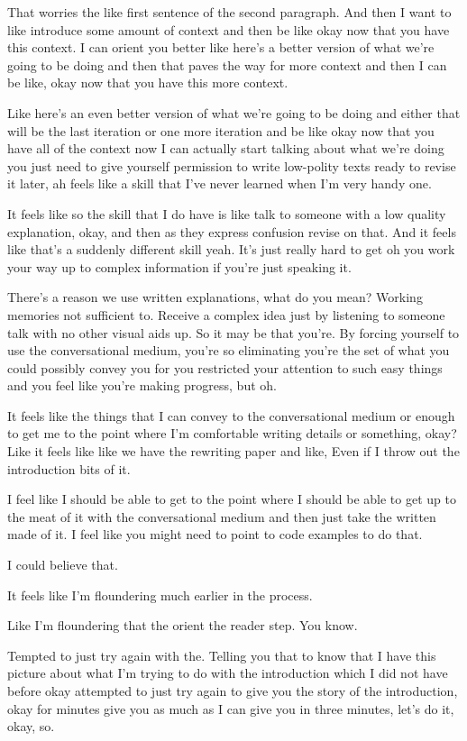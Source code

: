 \begin{subappendices}
That worries the like first sentence of the second paragraph. And then I want to like introduce some amount of context and then be like okay now that you have this context. I can orient you better like here's a better version of what we're going to be doing and then that paves the way for more context and then I can be like, okay now that you have this more context.

Like here's an even better version of what we're going to be doing and either that will be the last iteration or one more iteration and be like okay now that you have all of the context now I can actually start talking about what we're doing you just need to give yourself permission to write low-polity texts ready to revise it later, ah feels like a skill that I've never learned when I'm very handy one.

It feels like so the skill that I do have is like talk to someone with a low quality explanation, okay, and then as they express confusion revise on that. And it feels like that's a suddenly different skill yeah. It's just really hard to get oh you work your way up to complex information if you're just speaking it.

There's a reason we use written explanations, what do you mean? Working memories not sufficient to. Receive a complex idea just by listening to someone talk with no other visual aids up. So it may be that you're. By forcing yourself to use the conversational medium, you're so eliminating you're the set of what you could possibly convey you for you restricted your attention to such easy things and you feel like you're making progress, but oh.

It feels like the things that I can convey to the conversational medium or enough to get me to the point where I'm comfortable writing details or something, okay? Like it feels like like we have the rewriting paper and like, Even if I throw out the introduction bits of it.

I feel like I should be able to get to the point where I should be able to get up to the meat of it with the conversational medium and then just take the written made of it. I feel like you might need to point to code examples to do that.

I could believe that.

It feels like I'm floundering much earlier in the process.

Like I'm floundering that the orient the reader step. You know.

Tempted to just try again with the. Telling you that to know that I have this picture about what I'm trying to do with the introduction which I did not have before okay attempted to just try again to give you the story of the introduction, okay for minutes give you as much as I can give you in three minutes, let's do it, okay, so.


\end{subappendices}
